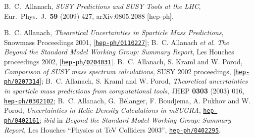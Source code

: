 \documentclass[]{article}
\begin{document}
\begin{thebibliography}{10}




  B.~C.~Allanach,
  {\em SUSY Predictions and SUSY Tools at the LHC}, Eur.\ Phys.\ J.\ {\bf 59}
  (2009) 427,
  arXiv:0805.2088 [hep-ph].

B.~C. Allanach, {\it Theoretical Uncertainties in Sparticle Mass Predictions},
Snowmass Proceedings 2001, 
  [\href{http://xxx.lanl.gov/abs/hep-ph/0110227}{{\tt hep-ph/0110227}}];
B.~C. Allanach {\em et al}. {\it The Beyond the Standard Model Working Group:
  Summary Report}, Les Houches proceedings 2002,
  [\href{http://xxx.lanl.gov/abs/hep-ph/0204031}{{\tt hep-ph/0204031}}].
B.~C. Allanach, S. Kraml and W. Porod, {\it Comparison of SUSY mass spectrum
  calculations}, SUSY 2002 proceedings,
[\href{http://xxx.lanl.gov/abs/hep-ph/0207314}{{\tt hep-ph/0207314}}];
B.~C. Allanach, S. Kraml and W. Porod, {\it Theoretical uncertainties in
  sparticle mass predictions from computational tools}, 
JHEP {\bf 0303} (2003) 016, 
\href{http://xxx.lanl.gov/abs/hep-ph/0302102}{{\tt hep-ph/0302102}};
B.~C. Allanach, G.~B\'{e}langer, F. Boudjema, A. Pukhov and W. Porod, 
{\it Uncertainties in Relic Density Calculations in mSUGRA},
\href{http://xxx.lanl.gov/abs/hep-ph/0402161}{{\tt hep-ph/0402161}};
{\em ibid}\/ in {\it Beyond the Standard Model Working Group: Summary Report},
Les Houches ``Physics at TeV Colliders 2003'', 
\href{http://xxx.lanl.gov/abs/hep-ph/0402161}{{\tt hep-ph/0402295}}.


\end{thebibliography}
\end{document}
